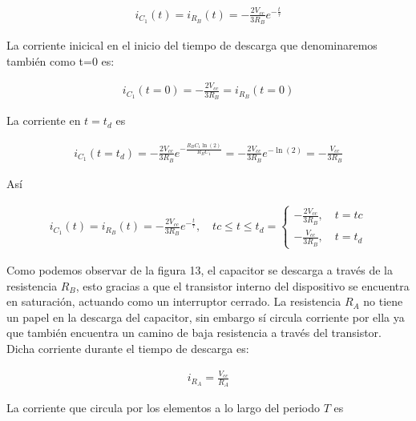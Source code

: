 \documentclass{article}
\begin{document}
\begin{align}
	i_{C_1}(t) = i_{R_B}(t) = -\frac{2V_{cc}}{3R_B}e^{-\frac{t}{\tau}}
\end{align}

La corriente inicical en el inicio del tiempo de descarga que denominaremos también como t=0 es:

\begin{align}
	i_{C_1}(t=0) =  -\frac{2V_{cc}}{3R_B} = i_{R_B}(t=0)
\end{align}

La corriente en $t=t_d$ es

\begin{align}
	i_{C_1}(t=t_d) = -\frac{2V_{cc}}{3R_B}e^{-\frac{R_BC_1\ln(2)}{R_BC_1}} = -\frac{2V_{cc}}{3R_B} e^{-\ln(2)} = -\frac{V_{cc}}{3R_B}
\end{align}

Así

\begin{tcolorbox}[colback=red!5!white,colframe=red!75!black,arc=0mm,boxrule=0mm,width=(\linewidth+0.5cm)]
	\begin{align}
		i_{C_1}(t) = i_{R_B}(t) = -\frac{2V_{cc}}{3R_B}e^{-\frac{t}{\tau}},  \quad tc \leq t \leq t_d = 
		\begin{cases}
			-\frac{2V_{cc}}{3R_B}, \quad t = tc \\
			-\frac{V_{cc}}{3R_B}, \quad t = t_d
		\end{cases}	
	\end{align}
\end{tcolorbox}

Como podemos observar de la figura 13, el capacitor se descarga a través de la resistencia $R_B$, esto gracias a que el transistor interno del dispositivo se encuentra en saturación, actuando como un interruptor cerrado. La resistencia $R_A$ no tiene un papel en la descarga del capacitor, sin embargo sí circula corriente por ella ya que también encuentra un camino de baja resistencia a través del transistor. Dicha corriente durante el tiempo de descarga es:

\begin{align}
	i_{R_A} = \frac{V_{cc}}{R_A}
\end{align}

La corriente que circula por los elementos a lo largo del periodo $T$ es
\end{document}
